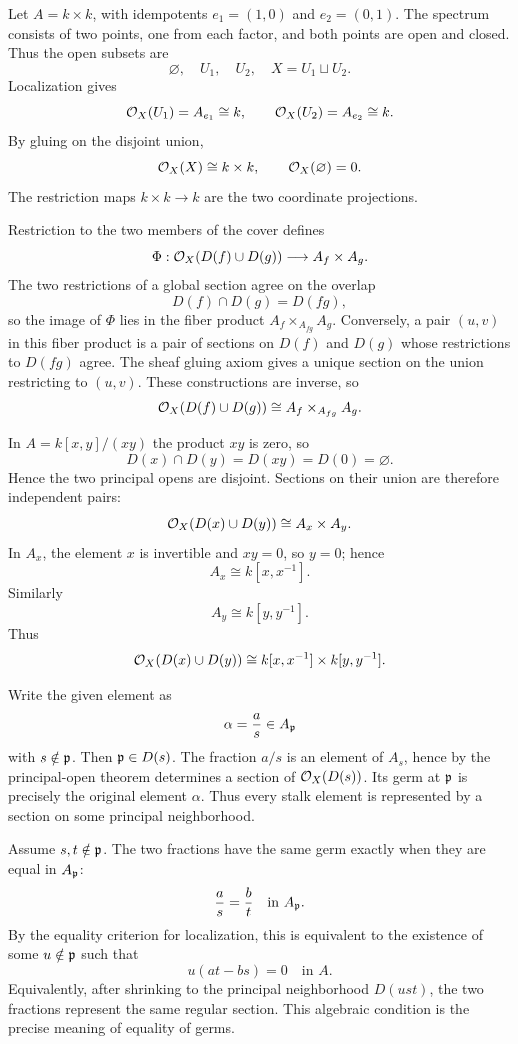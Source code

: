 \begin{solution}[Exercise VI.17.15]
Let $A=k\times k$, with idempotents $e_1=(1,0)$ and $e_2=(0,1)$.  The spectrum consists of two points, one from each factor, and both points are open and closed.  Thus the open subsets are
\[
\varnothing,\quad U_1,\quad U_2,\quad X=U_1\sqcup U_2.
\]
Localization gives
\[
\mathcal O_X(U_1)=A_{e_1}\cong k,
\qquad
\mathcal O_X(U_2)=A_{e_2}\cong k.
\]
By gluing on the disjoint union,
\[
\mathcal O_X(X)\cong k\times k,
\qquad
\mathcal O_X(\varnothing)=0.
\]
The restriction maps $k\times k\to k$ are the two coordinate projections.
\end{solution}

\begin{solution}[Exercise VI.17.16]
Restriction to the two members of the cover defines
\[
\Phi:\mathcal O_X(D(f)\cup D(g))\longrightarrow A_f\times A_g.
\]
The two restrictions of a global section agree on the overlap
\[
D(f)\cap D(g)=D(fg),
\]
so the image of $\Phi$ lies in the fiber product $A_f\times_{A_{fg}}A_g$.
Conversely, a pair $(u,v)$ in this fiber product is a pair of sections on $D(f)$ and $D(g)$ whose restrictions to $D(fg)$ agree.  The sheaf gluing axiom gives a unique section on the union restricting to $(u,v)$.  These constructions are inverse, so
\[
\mathcal O_X(D(f)\cup D(g))\cong A_f\times_{A_{fg}}A_g.
\]
\end{solution}

\begin{solution}[Exercise VI.17.17]
In $A=k[x,y]/(xy)$ the product $xy$ is zero, so
\[
D(x)\cap D(y)=D(xy)=D(0)=\varnothing.
\]
Hence the two principal opens are disjoint.  Sections on their union are therefore independent pairs:
\[
\mathcal O_X(D(x)\cup D(y))\cong A_x\times A_y.
\]
In $A_x$, the element $x$ is invertible and $xy=0$, so $y=0$; hence
\[
A_x\cong k[x,x^{-1}].
\]
Similarly
\[
A_y\cong k[y,y^{-1}].
\]
Thus
\[
\mathcal O_X(D(x)\cup D(y))\cong k[x,x^{-1}]\times k[y,y^{-1}].
\]
\end{solution}

\begin{solution}[Exercise VI.17.18]
Write the given element as
\[
\alpha=\frac as\in A_{\mathfrak p}
\]
with $s\notin\mathfrak p$.  Then $\mathfrak p\in D(s)$.  The fraction $a/s$ is an element of $A_s$, hence by the principal-open theorem determines a section of $\mathcal O_X(D(s))$.  Its germ at $\mathfrak p$ is precisely the original element $\alpha$.  Thus every stalk element is represented by a section on some principal neighborhood.
\end{solution}

\begin{solution}[Exercise VI.17.19]
Assume $s,t\notin\mathfrak p$.  The two fractions have the same germ exactly when they are equal in $A_{\mathfrak p}$:
\[
\frac as=\frac bt\quad\text{in }A_{\mathfrak p}.
\]
By the equality criterion for localization, this is equivalent to the existence of some $u\notin\mathfrak p$ such that
\[
u(at-bs)=0\quad\text{in }A.
\]
Equivalently, after shrinking to the principal neighborhood $D(ust)$, the two fractions represent the same regular section.  This algebraic condition is the precise meaning of equality of germs.
\end{solution}

